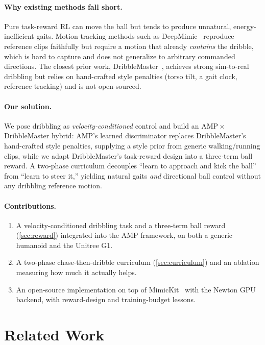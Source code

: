 \documentclass[10pt,twocolumn,letterpaper]{article}
\begin{document}
\paragraph{Why existing methods fall short.}
Pure task-reward RL can move the ball but tends to produce unnatural,
energy-inefficient gaits. Motion-tracking methods such as
DeepMimic~\cite{2018-TOG-deepMimic} reproduce reference clips faithfully but
require a motion that already \emph{contains} the dribble, which is hard to
capture and does not generalize to arbitrary commanded directions. The closest
prior work, DribbleMaster~\cite{wang2025dribble}, achieves strong sim-to-real
dribbling but relies on hand-crafted style penalties (torso tilt, a gait clock,
reference tracking) and is not open-sourced.

\paragraph{Our solution.}
We pose dribbling as \emph{velocity-conditioned} control and build an
AMP\,$\times$\,DribbleMaster hybrid: AMP's learned discriminator replaces
DribbleMaster's hand-crafted style penalties, supplying a style prior from
generic walking/running clips, while we adapt DribbleMaster's task-reward design
into a three-term ball reward. A two-phase curriculum decouples ``learn to
approach and kick the ball'' from ``learn to steer it,'' yielding natural gaits
\emph{and} directional ball control without any dribbling reference motion.

\paragraph{Contributions.}
\begin{enumerate}
    \item A velocity-conditioned dribbling task and a three-term ball reward
    (\cref{sec:reward}) integrated into the AMP framework, on both a generic
    humanoid and the Unitree G1.
    \item A two-phase chase-then-dribble curriculum (\cref{sec:curriculum}) and
    an ablation measuring how much it actually helps.
    \item An open-source implementation on top of MimicKit~\cite{MimicKitPeng2025}
    with the Newton GPU backend, with reward-design and training-budget lessons.
\end{enumerate}

\section{Related Work}
\label{sec:relatedwork}
\end{document}

